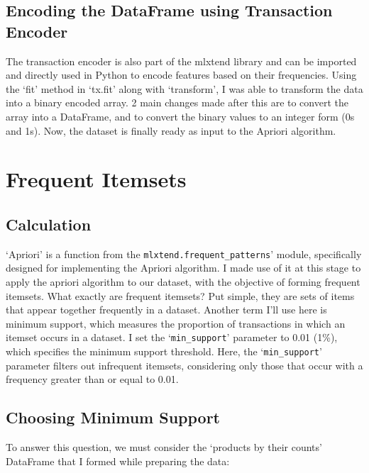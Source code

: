 \subsection{Encoding the DataFrame using Transaction Encoder}
The transaction encoder is also part of the mlxtend library and can be imported and directly used in Python to encode features based on their frequencies. Using the ‘fit’ method in ‘tx.fit’ along with ‘transform’, I was able to transform the data into a binary encoded array. 2 main changes made after this are to convert the array into a DataFrame, and to convert the binary values to an integer form (0s and 1s). Now, the dataset is finally ready as input to the Apriori algorithm.

\section{Frequent Itemsets}

\subsection{Calculation}

‘Apriori’ is a function from the \verb|mlxtend.frequent_patterns|’ module, specifically designed for implementing the Apriori algorithm. I made use of it at this stage to apply the apriori algorithm to our dataset, with the objective of forming frequent itemsets. What exactly are frequent itemsets? Put simple, they are sets of items that appear together frequently in a dataset. Another term I’ll use here is minimum support, which measures the proportion of transactions in which an itemset occurs in a dataset. I set the ‘\verb|min_support|’ parameter to 0.01 (1\%), which specifies the minimum support threshold. Here, the ‘\verb|min_support|’ parameter filters out infrequent itemsets, considering only those that occur with a frequency greater than or equal to 0.01.
\subsection{Choosing Minimum Support}
To answer this question, we must consider the ‘products by their counts’ DataFrame that I formed while preparing the data:

